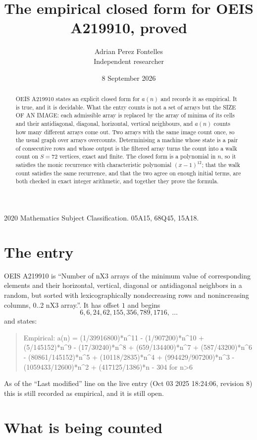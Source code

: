 \documentclass[11pt,a4paper]{article}
\title{The empirical closed form for OEIS A219910, proved}
\author{Adrian Perez Fontelles\\ \small Independent researcher}
\date{8 September 2026}
\theoremstyle{plain}
\theoremstyle{definition}
\begin{document}
\maketitle

\begin{abstract}
OEIS A219910 states an explicit closed form for $a(n)$ and records it as empirical. It is true, and
it is decidable. What the entry counts is not a set of arrays but the SIZE OF AN IMAGE: each
admissible array is replaced by the array of minima of its cells and their antidiagonal, diagonal, horizontal, vertical neighbours,
and $a(n)$ counts how many different arrays come out. Two arrays with the same image count
once, so the usual graph over arrays overcounts. Determinising a machine whose state is a pair
of consecutive rows and whose output is the filtered array turns the count into a walk count on
$S=72$ vertices, exact and finite. The closed form is a polynomial in $n$, so it satisfies the
monic recurrence with characteristic polynomial $(x-1)^{12}$; that the walk count
satisfies the same recurrence, and that the two agree on enough initial terms, are both checked
in exact integer arithmetic, and together they prove the formula.
\end{abstract}

\noindent\small 2020 Mathematics Subject Classification. 05A15, 68Q45, 15A18.\normalsize

\section{The entry}

OEIS A219910 is ``Number of nX3 arrays of the minimum value of corresponding elements and their horizontal, vertical, diagonal or antidiagonal neighbors in a random, but sorted with lexicographically nondecreasing rows and nonincreasing columns, 0..2 nX3 array.''. It has offset $1$ and begins
\[
6, 6, 24, 62, 155, 356, 789, 1716,\ \dots
\]
and states:
\begin{quote}
Empirical: a(n) = (1/39916800)*n\^{}11 - (1/907200)*n\^{}10 + (5/145152)*n\^{}9 - (17/30240)*n\^{}8 + (659/134400)*n\^{}7 + (587/43200)*n\^{}6 - (80861/145152)*n\^{}5 + (10118/2835)*n\^{}4 + (994429/907200)*n\^{}3 - (1059433/12600)*n\^{}2 + (417125/1386)*n - 304 for n>6
\end{quote}
As of the ``Last modified'' line on the live entry (Oct 03 2025 18:24:06, revision 8)
this is still recorded as empirical, and it is still open.

\section{What is being counted}
\end{document}
